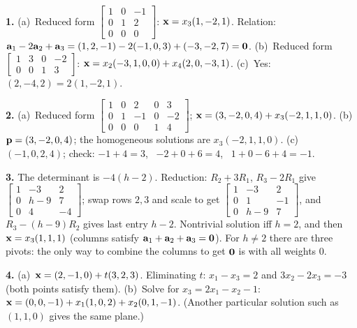 \documentclass[11pt]{article}
\begin{document}
\begin{sol}
\textbf{1.} (a)~Reduced form $\begin{bmatrix}1&0&-1\\0&1&2\\0&0&0\end{bmatrix}$: $\mathbf{x}=x_3(1,-2,1)$. Relation: $\mathbf{a}_1-2\mathbf{a}_2+\mathbf{a}_3=(1,2,-1)-2(-1,0,3)+(-3,-2,7)=\mathbf{0}$. (b)~Reduced form $\begin{bmatrix}1&3&0&-2\\0&0&1&3\end{bmatrix}$: $\mathbf{x}=x_2(-3,1,0,0)+x_4(2,0,-3,1)$. (c)~Yes: $(2,-4,2)=2(1,-2,1)$.

\textbf{2.} (a)~Reduced form $\begin{bmatrix}1&0&2&0&3\\0&1&-1&0&-2\\0&0&0&1&4\end{bmatrix}$; $\mathbf{x}=(3,-2,0,4)+x_3(-2,1,1,0)$. (b)~$\mathbf{p}=(3,-2,0,4)$; the homogeneous solutions are $x_3(-2,1,1,0)$. (c)~$(-1,0,2,4)$; check: $-1+4=3$, \ $-2+0+6=4$, \ $1+0-6+4=-1$.

\textbf{3.} The determinant is $-4(h-2)$. Reduction: $R_2+3R_1$, $R_3-2R_1$ give $\begin{bmatrix}1&-3&2\\0&h-9&7\\0&4&-4\end{bmatrix}$; swap rows $2,3$ and scale to get $\begin{bmatrix}1&-3&2\\0&1&-1\\0&h-9&7\end{bmatrix}$, and $R_3-(h-9)R_2$ gives last entry $h-2$. Nontrivial solution iff $h=2$, and then $\mathbf{x}=x_3(1,1,1)$ (columns satisfy $\mathbf{a}_1+\mathbf{a}_2+\mathbf{a}_3=\mathbf{0}$). For $h\neq2$ there are three pivots: the only way to combine the columns to get $\mathbf{0}$ is with all weights $0$.

\textbf{4.} (a)~$\mathbf{x}=(2,-1,0)+t(3,2,3)$. Eliminating $t$: $x_1-x_3=2$ and $3x_2-2x_3=-3$ (both points satisfy them). (b)~Solve for $x_3=2x_1-x_2-1$: $\mathbf{x}=(0,0,-1)+x_1(1,0,2)+x_2(0,1,-1)$. (Another particular solution such as $(1,1,0)$ gives the same plane.)
\end{sol}
\end{document}
